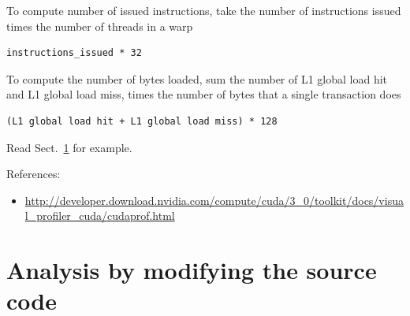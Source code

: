 To compute number of issued instructions, take the number of
instructions issued times the number of threads in a warp
\begin{verbatim}
instructions_issued * 32
\end{verbatim}

To compute the number of bytes loaded, sum the number of L1 global
load hit and L1 global load miss, times the number of bytes that a
single transaction does
\begin{verbatim}
(L1 global load hit + L1 global load miss) * 128
\end{verbatim}

Read Sect.~\ref{sec:analys-modify-source} for example. 


References:
\begin{itemize}
\item \url{http://developer.download.nvidia.com/compute/cuda/3_0/toolkit/docs/visual_profiler_cuda/cudaprof.html}
\end{itemize}

\section{Analysis by modifying the source code}
\label{sec:analys-modify-source}


